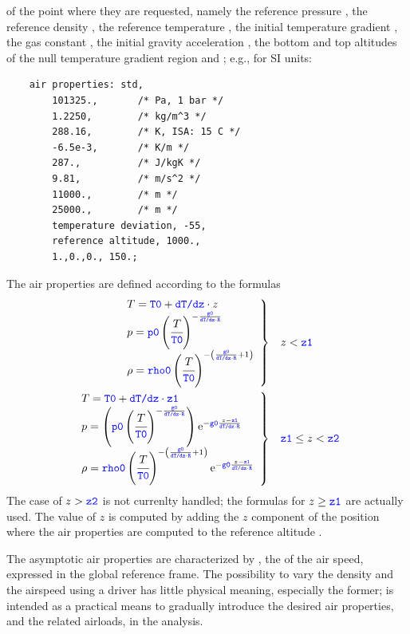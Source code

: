 of the point where they are requested, namely the reference
pressure , the reference density ,
the reference temperature , the initial temperature
gradient , the gas constant , the
initial gravity acceleration , the bottom and top
altitudes of the null temperature gradient region  and
; e.g., for SI units:
\begin{verbatim}
    air properties: std,
        101325.,       /* Pa, 1 bar */
        1.2250,        /* kg/m^3 */
        288.16,        /* K, ISA: 15 C */
        -6.5e-3,       /* K/m */
        287.,          /* J/kgK */
        9.81,          /* m/s^2 */
        11000.,        /* m */
        25000.,        /* m */
        temperature deviation, -55,
        reference altitude, 1000.,
        1.,0.,0., 150.;
\end{verbatim}
The air properties are defined according to the formulas
\begin{subequations}
\begin{align}
	\left. \begin{array}{l} 
		T = \textcolor{blue}{\texttt{T0}} + \textcolor{blue}{\texttt{dT/dz}} \cdot z
		\\
		p = \textcolor{blue}{\texttt{p0}} \left( \cfrac{T}{\textcolor{blue}{\texttt{T0}}} \right)^{-\frac{\textcolor{blue}{\texttt{g0}}}{\textcolor{blue}{\texttt{dT/dz}} \cdot \textcolor{blue}{\texttt{R}}}}
		\\
		\rho = \textcolor{blue}{\texttt{rho0}} \left( \cfrac{T}{\textcolor{blue}{\texttt{T0}}} \right)^{-\left( \frac{\textcolor{blue}{\texttt{g0}}}{\textcolor{blue}{\texttt{dT/dz}} \cdot \textcolor{blue}{\texttt{R}}} + 1 \right)}
	 \end{array} \right\}
	&&& z < \textcolor{blue}{\texttt{z1}}
	\\
	\left. \begin{array}{l} 
		T = \textcolor{blue}{\texttt{T0}} + \textcolor{blue}{\texttt{dT/dz}} \cdot \textcolor{blue}{\texttt{z1}}
		\\
		p = \left( \textcolor{blue}{\texttt{p0}}\left( \cfrac{T}{\textcolor{blue}{\texttt{T0}}} \right)^{-\frac{\textcolor{blue}{\texttt{g0}}}{\textcolor{blue}{\texttt{dT/dz}} \cdot \textcolor{blue}{\texttt{R}}}} \right)
			\mathrm{e}^{-\textcolor{blue}{\texttt{g0}} \frac{z - \textcolor{blue}{\texttt{z1}}}{\textcolor{blue}{\texttt{dT/dz}} \cdot \textcolor{blue}{\texttt{R}}}}
		\\
		\rho = \textcolor{blue}{\texttt{rho0}} \left( \cfrac{T}{\textcolor{blue}{\texttt{T0}}} \right)^{-\left( \frac{\textcolor{blue}{\texttt{g0}}}{\textcolor{blue}{\texttt{dT/dz}} \cdot \textcolor{blue}{\texttt{R}}} + 1 \right)}
			\mathrm{e}^{-\textcolor{blue}{\texttt{g0}} \frac{z - \textcolor{blue}{\texttt{z1}}}{\textcolor{blue}{\texttt{dT/dz}} \cdot \textcolor{blue}{\texttt{R}}}}
	 \end{array} \right\}
	&&& \textcolor{blue}{\texttt{z1}} \le z < \textcolor{blue}{\texttt{z2}}
\end{align}
\end{subequations}
The case of $z > \textcolor{blue}{\texttt{z2}}$ is not currenlty handled;
the formulas for $z \ge \textcolor{blue}{\texttt{z1}}$ are actually used.
The value of $z$ is computed by adding the $z$ component
of the position where the air properties are computed
to the reference altitude .

The asymptotic air properties are characterized by ,
the  of the air speed,
expressed in the global reference frame.
The possibility to vary the density and the airspeed using a driver
has little physical meaning, especially the former;
is intended as a practical means to gradually introduce
the desired air properties, and the related airloads, in the analysis.

